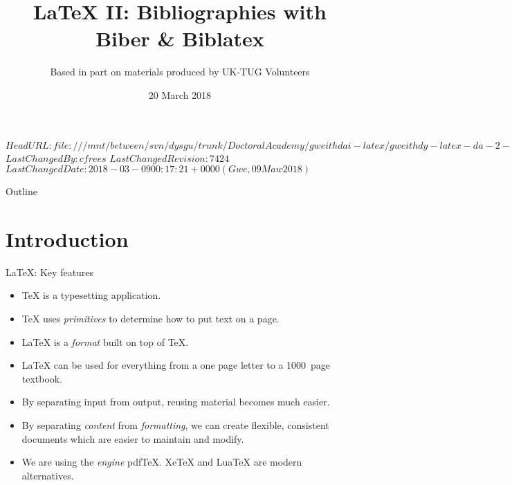 \svnidlong
{$HeadURL: file:///mnt/between/svn/dysgu/trunk/DoctoralAcademy/gweithdai-latex/gweithdy-latex-da-2-biblatex/training.tex $}
{$LastChangedBy: cfrees $}
{$LastChangedRevision: 7424 $}
{$LastChangedDate: 2018-03-09 00:17:21 +0000 (Gwe, 09 Maw 2018) $}



\title{\LaTeX{} II: Bibliographies with Biber \& Biblatex}
\subtitle{Based in part on materials produced by UK-TUG Volunteers}
\date{ 20 March 2018}




\begin{frame}
  \titlepage
\end{frame}

\maketitle


\tableofcontents

%
{
  \begin{frame}{Outline}
    \tableofcontents
  \end{frame}
}

%

\section{Introduction}

\begin{frame}{\LaTeX{}: Key features}

  \begin{itemize}
    \item \TeX{} is a typesetting application.
    \item \TeX{} uses \emph{primitives} to determine how to put text on a page.
    \item \LaTeX{} is  a \emph{format} built on top of \TeX{}.
    \item \LaTeX{} can be used for everything from a one page letter to a 1000~page textbook.
    \item By separating input from output, reusing material becomes much easier.
    \item By separating \emph{content} from \emph{formatting}, we can create flexible, consistent documents which are easier to maintain and modify.
    \item We are using the \emph{engine} pdf\TeX{}.
    Xe\TeX{} and Lua\TeX{} are modern alternatives.
  \end{itemize}

\end{frame}

